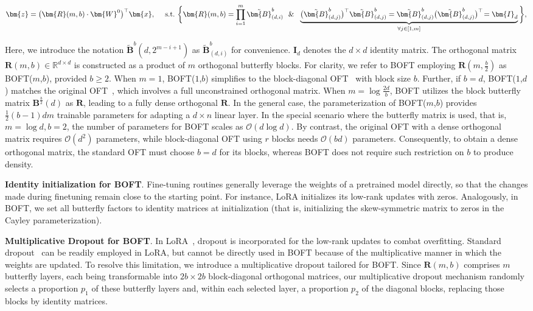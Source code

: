 \begin{equation}
    \begin{aligned}\nonumber
    \bm{z}=\big(\bm{R}(m,b)\cdot\bm{W}^0\big)^\top\bm{x},~~~~\text{s.t.}~\bigg{\{}\bm{R}(m,b)=\prod_{i=1}^m \tilde{\bm{B}}^b_{(d,i)}~~\&~~\underbrace{\big(\tilde{\bm{B}}^b_{(d,j)}\big)^\top\tilde{\bm{B}}^b_{(d,j)}=\tilde{\bm{B}}^b_{(d,j)}\big(\tilde{\bm{B}}^b_{(d,j)}\big)^\top\!=\bm{I}_d}_{\forall j\in [1, m]}\bigg{\}},
    \end{aligned}
\end{equation}

Here, we introduce the notation $\tilde{\bm{B}}^b(d,2^{m - i+1})$ as $\tilde{\bm{B}}^b_{(d,i)}$ for convenience. $\bm{I}_d$ denotes the $d\times d$ identity matrix. The orthogonal matrix $\bm{R}(m,b)\in\mathbb{R}^{d\times d}$ is constructed as a product of $m$ orthogonal butterfly blocks. For clarity, we refer to BOFT employing $\bm{R}(m,\frac{b}{2})$ as BOFT($m$,$b$), provided $b\geq 2$. When $m=1$, BOFT($1$,$b$) simplifies to the block-diagonal OFT~\cite{qiu2023controlling} with block size $b$. Further, if $b=d$, BOFT($1$,$d$) matches the original OFT~\cite{qiu2023controlling}, which involves a full unconstrained orthogonal matrix. When $m = \log \frac{2d}{b}$, BOFT utilizes the block butterfly matrix $\bm{B}^{\frac{b}{2}}(d)$ as $\bm{R}$, leading to a fully dense orthogonal $\bm{R}$. In the general case, the parameterization of BOFT($m$,$b$) provides $\frac{1}{2}(b-1)dm$ trainable parameters for adapting a $d\times n$ linear layer. In the special scenario where the butterfly matrix is used, that is, $m=\log d, b=2$, the number of parameters for BOFT scales as $\mathcal{O}(d\log d)$. By contrast, the original OFT with a dense orthogonal matrix requires $\mathcal{O}(d^2)$ parameters, while block-diagonal OFT using $r$ blocks needs $\mathcal{O}(bd)$ parameters. Consequently, to obtain a dense orthogonal matrix, the standard OFT must choose $b=d$ for its blocks, whereas BOFT does not require such restriction on $b$ to produce density.

\textbf{Identity initialization for BOFT}. Fine-tuning routines generally leverage the weights of a pretrained model directly, so that the changes made during finetuning remain close to the starting point. For instance, LoRA initializes its low-rank updates with zeros. Analogously, in BOFT, we set all butterfly factors to identity matrices at initialization (that is, initializing the skew-symmetric matrix to zeros in the Cayley parameterization).

\textbf{Multiplicative Dropout for BOFT}. In LoRA~\cite{hulora2022}, dropout is incorporated for the low-rank updates to combat overfitting. Standard dropout~\cite{srivastava2014dropout} can be readily employed in LoRA, but cannot be directly used in BOFT because of the multiplicative manner in which the weights are updated. To resolve this limitation, we introduce a multiplicative dropout tailored for BOFT. Since $\bm{R}(m,b)$ comprises $m$ butterfly layers, each being transformable into $2b\times 2b$ block-diagonal orthogonal matrices, our multiplicative dropout mechanism randomly selects a proportion $p_1$ of these butterfly layers and, within each selected layer, a proportion $p_2$ of the diagonal blocks, replacing those blocks by identity matrices.

